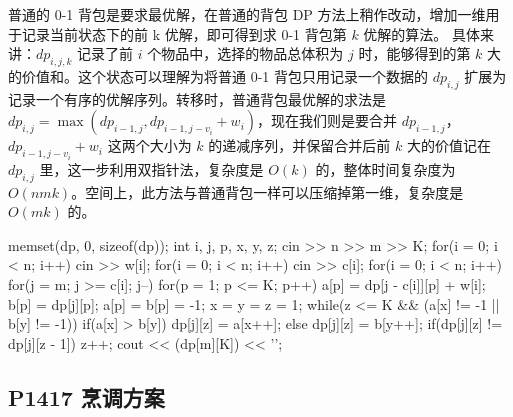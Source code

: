 普通的 0-1 背包是要求最优解，在普通的背包 DP 方法上稍作改动，增加一维用于记录当前状态下的前 k 优解，即可得到求 0-1 背包第 \(k\) 优解的算法。 具体来讲：\(\mathit{dp_{i,j,k}}\) 记录了前 \(i\) 个物品中，选择的物品总体积为 \(j\) 时，能够得到的第 \(k\) 大的价值和。这个状态可以理解为将普通 0-1 背包只用记录一个数据的 \(\mathit{dp_{i,j}}\) 扩展为记录一个有序的优解序列。转移时，普通背包最优解的求法是 \(\mathit{dp_{i,j}}=\max(\mathit{dp_{i-1,j}},\mathit{dp_{i-1,j-v_{i}}}+w_{i})\)，现在我们则是要合并 \(\mathit{dp_{i-1,j}}\)，\(\mathit{dp_{i-1,j-v_{i}}}+w_{i}\) 这两个大小为 \(k\) 的递减序列，并保留合并后前 \(k\) 大的价值记在 \(\mathit{dp_{i,j}}\) 里，这一步利用双指针法，复杂度是 \(O(k)\) 的，整体时间复杂度为 \(O(nmk)\)。空间上，此方法与普通背包一样可以压缩掉第一维，复杂度是 \(O(mk)\) 的。


\begin{codeline}
memset(dp, 0, sizeof(dp));
int i, j, p, x, y, z;
cin >> n >> m >> K;
for(i = 0; i < n; i++) {
    cin >> w[i];
}
for(i = 0; i < n; i++) {
    cin >> c[i];
}
for(i = 0; i < n; i++) {
    for(j = m; j >= c[i]; j--) {
        for(p = 1; p <= K; p++) {
            a[p] = dp[j - c[i]][p] + w[i];
            b[p] = dp[j][p];
        }
        a[p] = b[p] = -1;
        x = y = z = 1;
        while(z <= K && (a[x] != -1 || b[y] != -1)) {
            if(a[x] > b[y]) {
                dp[j][z] = a[x++];
            } else {
                dp[j][z] = b[y++];
            }
            if(dp[j][z] != dp[j][z - 1]) {
                z++;
            }
        }
    }
}
cout << (dp[m][K]) << '\n';
\end{codeline}


\subsection{P1417 烹调方案}\label{p1417-ux70f9ux8c03ux65b9ux6848}






